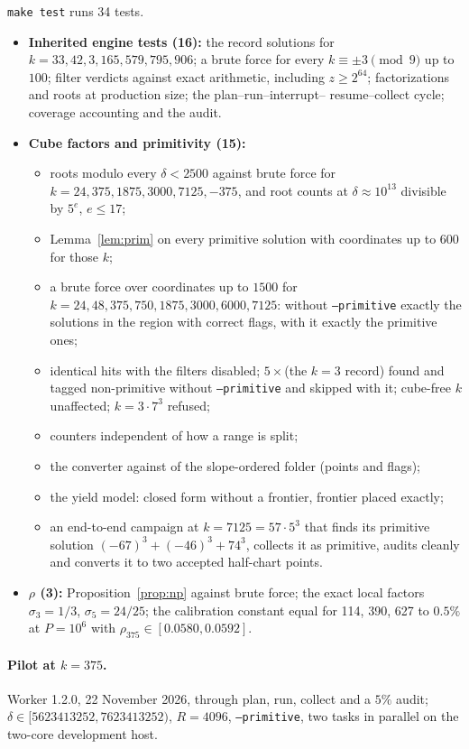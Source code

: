 \documentclass[11pt,a4paper]{article}
\theoremstyle{remark}
\newcommand{\code}[1]{\path{#1}}
\begin{document}
\texttt{make test} runs 34 tests.
\begin{itemize}[leftmargin=*]
\item \textbf{Inherited engine tests (16):} the record solutions for $k=33,42,3,165,579,795,906$; a
brute force for every $k\equiv\pm3\pmod9$ up to $100$; filter verdicts against exact arithmetic,
including $z\ge2^{64}$; factorizations and roots at production size; the plan--run--interrupt--%
resume--collect cycle; coverage accounting and the audit.
\item \textbf{Cube factors and primitivity (15):}
  \begin{itemize}
  \item roots modulo every $\delta<2500$ against brute force for $k=24,375,1875,3000,7125,-375$,
  and root counts at $\delta\approx10^{13}$ divisible by $5^e$, $e\le17$;
  \item Lemma~\ref{lem:prim} on every primitive solution with coordinates up to $600$ for those $k$;
  \item a brute force over coordinates up to $1500$ for $k=24,48,375,750,1875,3000,6000,7125$:
  without \texttt{--primitive} exactly the solutions in the region with correct flags, with it
  exactly the primitive ones;
  \item identical hits with the filters disabled; $5\times$(the $k=3$ record) found and tagged
  non-primitive without \texttt{--primitive} and skipped with it; cube-free $k$ unaffected;
  $k=3\cdot7^3$ refused;
  \item counters independent of how a range is split;
  \item the converter against \code{common375.py} of the slope-ordered folder (points and flags);
  \item the yield model: closed form without a frontier, frontier placed exactly;
  \item an end-to-end campaign at $k=7125=57\cdot5^3$ that finds its primitive solution
  $(-67)^3+(-46)^3+74^3$, collects it as primitive, audits cleanly and converts it to two
  accepted half-chart points.
  \end{itemize}
\item \textbf{$\rho$ (3):} Proposition~\ref{prop:np} against brute force; the exact local factors
$\sigma_3=1/3$, $\sigma_5=24/25$; the calibration constant equal for 114, 390, 627 to $0.5\%$ at
$P=10^6$ with $\rho_{375}\in[0.0580,0.0592]$.
\end{itemize}

\paragraph{Pilot at $k=375$.} Worker 1.2.0, 22 November 2026, through plan, run, collect and a
$5\%$ audit; $\delta\in[5623413252,7623413252)$, $R=4096$, \texttt{--primitive}, two tasks in
parallel on the two-core development host.
\end{document}

